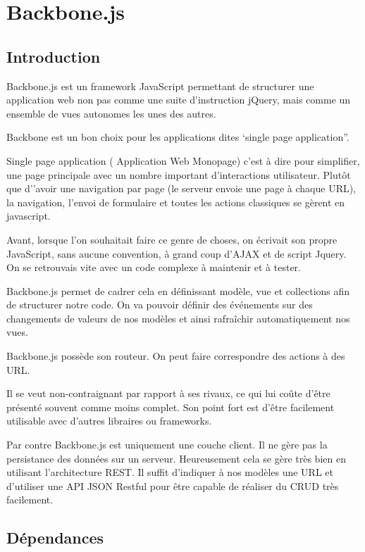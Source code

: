 \section{Backbone.js}
\label{ch:backbone}

\subsection{Introduction}

Backbone.js est un framework JavaScript permettant de structurer une application web non pas comme une suite d’instruction jQuery, mais comme un ensemble de vues autonomes les unes des autres.

Backbone est un bon choix pour les applications dites ‘single page application”.

Single page application ( Application Web Monopage) c’est à dire pour simplifier, une page principale avec un nombre important d'interactions utilisateur. Plutôt que d’’avoir une navigation par page (le serveur envoie une page à chaque URL), la navigation, l’envoi de formulaire et toutes les actions classiques se gèrent en javascript.

Avant, lorsque l'on souhaitait faire ce genre de choses, on écrivait son propre JavaScript, sans aucune convention, à grand coup d’AJAX et de script Jquery. On se retrouvais vite avec un code complexe à maintenir et à tester.

Backbone.js permet de cadrer cela en définissant modèle, vue et collections afin de structurer notre code. On va pouvoir définir des événements sur des changements de valeurs de nos modèles et ainsi rafraîchir automatiquement nos vues.

Backbone.js possède son routeur. On peut faire correspondre des actions à des URL.

Il se veut non-contraignant par rapport à ses rivaux, ce qui lui coûte d’être présenté souvent comme moins complet. Son point fort est d’être facilement utilisable avec d’autres libraires ou frameworks.

Par contre Backbone.js est uniquement une couche client. Il ne gère pas la persistance des données sur un serveur. Heureusement cela se gère très bien en utilisant l’architecture REST. Il suffit d’indiquer à nos modèles une URL et d’utiliser une API JSON Restful pour être capable de réaliser du CRUD très facilement. 


\subsection{Dépendances}


